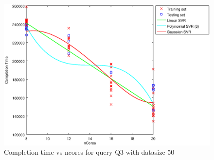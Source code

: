 
\begin {figure}[hbtp]
\centering
\includegraphics[width=\textwidth]{output/Q3_50_ONLY_NCORES/plot_Q3_50_bestmodels.eps}
\caption{Completion time vs ncores for query Q3 with datasize 50}
\label{fig:all_linear_Q3_50}
\end {figure}
